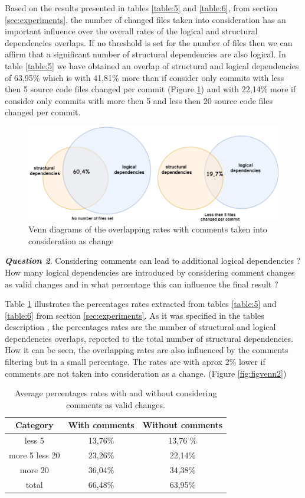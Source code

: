 \documentclass[conference]{IEEEtran}
\begin{document}
Based on the results presented in tables \ref{table:5} and \ref{table:6}, from section \ref{sec:experiments}, the number of changed files taken into consideration has an important influence over the overall rates of the logical and structural dependencies overlaps. If no threshold is set for the number of files then we can affirm that a significant number of structural dependencies are also logical. In table \ref{table:5} we have obtained an overlap of structural and logical dependencies of 63,95\% which is with 41,81\% more than if consider only commits with less then 5 source code files changed per commit (Figure \ref{fig:figvenn}) and with 22,14\% more if consider only commits with more then 5 and less then 20 source code files changed per commit.

\begin{figure}[h]
\centering
\includegraphics[scale=0.5]{fig4.png}
\caption{Venn diagrams of the overlapping rates with comments taken into consideration as change}
\label{fig:figvenn}
\end{figure}


\textit{\textbf{Question 2}}. Considering comments can lead to additional logical dependencies ? How many logical dependencies are introduced by considering comment changes as valid changes and in what percentage this can influence the final result ?

Table \ref{table:comm} illustrates the percentages rates extracted from tables \ref{table:5} and \ref{table:6} from section \ref{sec:experiments}. As it was specified in the tables description , the percentages rates are the number of structural and logical dependencies overlaps, reported to the total number of structural dependencies. How it can be seen, the overlapping rates are also influenced by the comments filtering but in a small percentage. The rates are with aprox 2\% lower if comments are not taken into consideration as a change. (Figure \ref{fig:figvenn2})


\begin{table}
  \centering
  \begin{tabular}{@{}c||cc@{}}
    \toprule
       Category & With comments & Without comments  \\
    \midrule
less 5	&	13,76\% &	13,76	\%	\\
more 5 less 20	&	23,26\% &	22,14\%\\
more 20	&	36,04\%	&	34,38\%\\
total & 66,48\% &63,95\% \\
    \bottomrule
  \end{tabular}
  \caption{Average percentages rates with and without considering comments as valid changes.}
   \label{table:comm}
\end{table}
\end{document}
